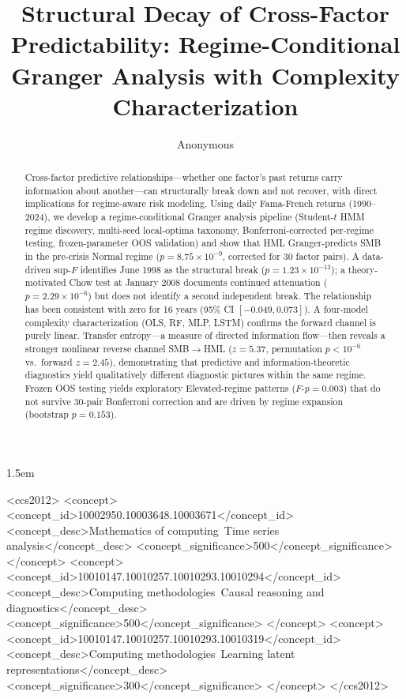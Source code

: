 \documentclass[sigconf,anonymous]{acmart}
\begin{document}
\sloppy
\emergencystretch 1.5em

\title{Structural Decay of Cross-Factor Predictability: Regime-Conditional Granger Analysis with Complexity Characterization}

\author{Anonymous}

\begin{abstract}
Cross-factor predictive relationships---whether one factor's past
returns carry information about another---can structurally break down
and not recover, with direct implications for regime-aware risk modeling.
Using daily Fama-French returns (1990--2024), we develop a
regime-conditional Granger analysis pipeline (Student-$t$ HMM regime
discovery, multi-seed local-optima taxonomy, Bonferroni-corrected
per-regime testing, frozen-parameter OOS validation) and show that
HML Granger-predicts SMB in the pre-crisis Normal regime
($p = 8.75 \times 10^{-9}$, corrected for 30 factor pairs).
A data-driven sup-$F$ identifies June 1998 as the structural break
($p = 1.23 \times 10^{-13}$); a theory-motivated Chow test at
January 2008 documents continued attenuation ($p = 2.29 \times 10^{-6}$)
but does not identify a second independent break.
The relationship has been consistent with zero for 16 years
(95\% CI $[-0.049, 0.073]$).
A four-model complexity characterization (OLS, RF, MLP, LSTM) confirms
the forward channel is purely linear. Transfer entropy---a measure of
directed information flow---then reveals a stronger nonlinear reverse
channel SMB$\to$HML ($z = 5.37$, permutation $p < 10^{-6}$ vs.\
forward $z = 2.45$), demonstrating that predictive and
information-theoretic diagnostics yield qualitatively different
diagnostic pictures within the same regime.
Frozen OOS testing yields exploratory Elevated-regime patterns
($F$-$p = 0.003$) that do not survive 30-pair Bonferroni correction
and are driven by regime expansion (bootstrap $p = 0.153$).
\end{abstract}

\begin{CCSXML}
<ccs2012>
   <concept>
       <concept_id>10002950.10003648.10003671</concept_id>
       <concept_desc>Mathematics of computing~Time series analysis</concept_desc>
       <concept_significance>500</concept_significance>
   </concept>
   <concept>
       <concept_id>10010147.10010257.10010293.10010294</concept_id>
       <concept_desc>Computing methodologies~Causal reasoning and diagnostics</concept_desc>
       <concept_significance>500</concept_significance>
   </concept>
   <concept>
       <concept_id>10010147.10010257.10010293.10010319</concept_id>
       <concept_desc>Computing methodologies~Learning latent representations</concept_desc>
       <concept_significance>300</concept_significance>
   </concept>
</ccs2012>
\end{CCSXML}
\end{document}
